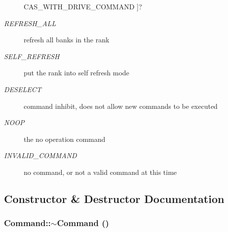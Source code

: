 \begin{Desc}
\begin{description}
{CAS\_\-WITH\_\-DRIVE\_\-COMMAND\label{class_d_r_a_msim_i_i_1_1_command_a6da0b8d60d4902551918e57f30350e92a24168f14afa62379fb862ed1dc2c35e0}
}]? \item[{\em 
REFRESH\_\-ALL\label{class_d_r_a_msim_i_i_1_1_command_a6da0b8d60d4902551918e57f30350e92a28b74de792cd065820bfb6d77e2aadf2}
}]refresh all banks in the rank \item[{\em 
SELF\_\-REFRESH\label{class_d_r_a_msim_i_i_1_1_command_a6da0b8d60d4902551918e57f30350e92a320774760d0fb5b3611206a58b9a5523}
}]put the rank into self refresh mode \item[{\em 
DESELECT\label{class_d_r_a_msim_i_i_1_1_command_a6da0b8d60d4902551918e57f30350e92a99fb83bee151099cd3cea20f39703a56}
}]command inhibit, does not allow new commands to be executed \item[{\em 
NOOP\label{class_d_r_a_msim_i_i_1_1_command_a6da0b8d60d4902551918e57f30350e92a68f7f9c34c9e0886a0069a19b140944e}
}]the no operation command \item[{\em 
INVALID\_\-COMMAND\label{class_d_r_a_msim_i_i_1_1_command_a6da0b8d60d4902551918e57f30350e92a65654c338c8418fc0ef506dbd0503c05}
}]no command, or not a valid command at this time \end{description}
\end{Desc}



\subsection{Constructor \& Destructor Documentation}
\subsubsection[{$\sim$Command}]{\setlength{\rightskip}{0pt plus 5cm}Command::$\sim$Command ()}\label{class_d_r_a_msim_i_i_1_1_command_ab552bb3a07fdd1acbfd8ea76e69b2278}


